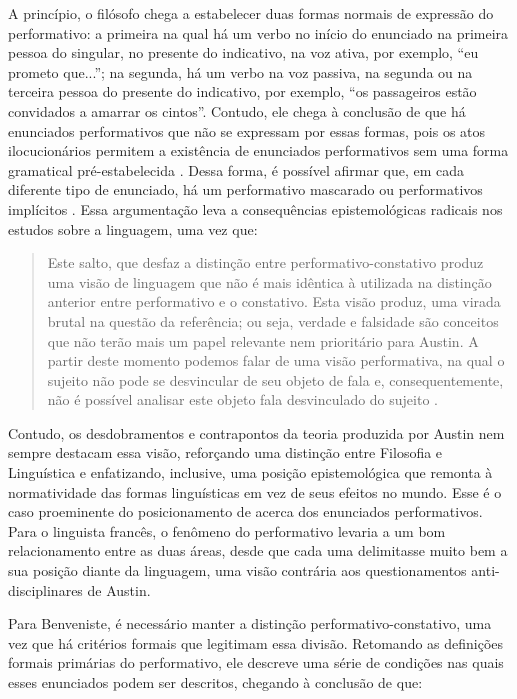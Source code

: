 \documentclass[portuguese]{textolivre}
\begin{document}
A princípio, o filósofo chega a estabelecer duas formas normais de expressão do performativo: a primeira na qual há um verbo no início do enunciado na primeira pessoa do singular, no presente do indicativo, na voz ativa, por exemplo, “eu prometo que...”; na segunda, há um verbo na voz passiva, na segunda ou na terceira pessoa do presente do indicativo, por exemplo, “os passageiros estão convidados a amarrar os cintos”. Contudo, ele chega à conclusão de que há enunciados performativos que não se expressam por essas formas, pois os atos ilocucionários permitem a existência de enunciados performativos sem uma forma gramatical pré-estabelecida \cite[p. 53–66]{austin1962how}. Dessa forma, é possível afirmar que, em cada diferente tipo de enunciado, há um performativo mascarado ou performativos implícitos \cite{ottoni2002austin}. Essa argumentação leva a consequências epistemológicas radicais nos estudos sobre a linguagem, uma vez que:

\begin{quote}
    Este salto, que desfaz a distinção entre performativo-constativo produz uma visão de linguagem que não é mais idêntica à utilizada na distinção anterior entre performativo e o constativo. Esta visão produz, uma virada brutal na questão da referência; ou seja, verdade e falsidade são conceitos que não terão mais um papel relevante nem prioritário para Austin. A partir deste momento podemos falar de uma visão performativa, na qual o sujeito não pode se desvincular de seu objeto de fala e, consequentemente, não é possível analisar este objeto fala desvinculado do sujeito \cite[p. 130]{ottoni2002austin}.
\end{quote}

Contudo, os desdobramentos e contrapontos da teoria produzida por Austin nem sempre destacam essa visão, reforçando uma distinção entre Filosofia e Linguística e enfatizando, inclusive, uma posição epistemológica que remonta à normatividade das formas linguísticas em vez de seus efeitos no mundo. Esse é o caso proeminente do posicionamento de \textcite{benveniste1991filosofia} acerca dos enunciados performativos. Para o linguista francês, o fenômeno do performativo levaria a um bom relacionamento entre as duas áreas, desde que cada uma delimitasse muito bem a sua posição diante da linguagem, uma visão contrária aos questionamentos anti-disciplinares de Austin.

Para Benveniste, é necessário manter a distinção performativo-constativo, uma vez que há critérios formais que legitimam essa divisão. Retomando as definições formais primárias do performativo, ele descreve uma série de condições nas quais esses enunciados podem ser descritos, chegando à conclusão de que:
\end{document}
